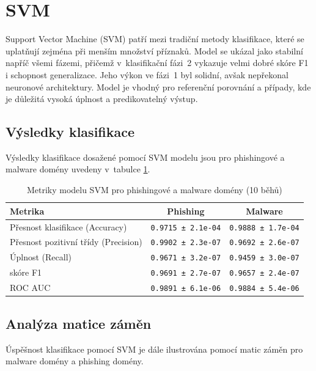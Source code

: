 \section{SVM}
Support Vector Machine (SVM) patří mezi tradiční metody klasifikace, které se uplatňují zejména při menším množství příznaků. Model se ukázal jako stabilní napříč všemi fázemi, přičemž v~klasifikační fázi~2 vykazuje velmi dobré skóre F1  i schopnost generalizace. Jeho výkon ve fázi~1 byl solidní, avšak nepřekonal neuronové architektury. Model je vhodný pro referenční porovnání a případy, kde je důležitá vysoká úplnost a predikovatelný výstup.

\subsection{Výsledky klasifikace}
Výsledky klasifikace dosažené pomocí SVM modelu jsou pro phishingové a malware domény uvedeny v~tabulce \ref{tab:svm_malware_phishing_results}.

\begin{table}[H]
\centering
\begin{tabular}{|l|c|c|}
\hline
\textbf{Metrika} & \textbf{Phishing} & \textbf{Malware} \\
\hline
Přesnost klasifikace (Accuracy)     & \texttt{0.9715 ± 2.1e-04} & \texttt{0.9888 ± 1.7e-04} \\
Přesnost pozitivní třídy (Precision)    & \texttt{0.9902 ± 2.3e-07} & \texttt{0.9692 ± 2.6e-07} \\
Úplnost (Recall)        & \texttt{0.9671 ± 3.2e-07} & \texttt{0.9459 ± 3.0e-07} \\
skóre F1                & \texttt{0.9691 ± 2.7e-07} & \texttt{0.9657 ± 2.4e-07} \\
ROC AUC                 & \texttt{0.9891 ± 6.1e-06} & \texttt{0.9884 ± 5.4e-06} \\
\hline
\end{tabular}
\caption{Metriky modelu SVM pro phishingové a malware domény (10 běhů)}
\label{tab:svm_malware_phishing_results}
\end{table}

\subsection{Analýza matice záměn}

Úspěšnost klasifikace pomocí SVM je dále ilustrována pomocí matic záměn pro malware domény a phishing domény. 


